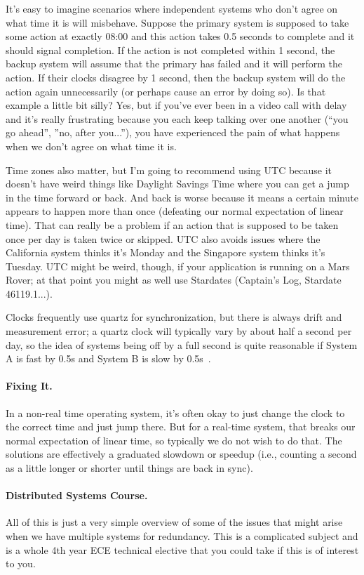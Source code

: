 It's easy to imagine scenarios where independent systems who don't agree on what time it is will misbehave. Suppose the primary system is supposed to take some action at exactly 08:00 and this action takes 0.5 seconds to complete and it should signal completion. If the action is not completed within 1 second, the backup system will assume that the primary has failed and it will perform the action. If their clocks disagree by 1 second, then the backup system will do the action again unnecessarily (or perhaps cause an error by doing so). Is that example a little bit silly? Yes, but if you've ever been in a video call with delay and it's really frustrating because you each keep talking over one another (``you go ahead'', ''no, after you...''), you have experienced the pain of what happens when we don't agree on what time it is.

Time zones also matter, but I'm going to recommend using UTC because it doesn't have weird things like Daylight Savings Time where you can get a jump in the time forward or back. And back is worse because it means a certain minute appears to happen more than once (defeating our normal expectation of linear time). That can really be a problem if an action that is supposed to be taken once per day is taken twice or skipped. UTC also avoids issues where the California system thinks it's Monday and the Singapore system thinks it's Tuesday. UTC might be weird, though, if your application is running on a Mars Rover; at that point you might as well use Stardates (Captain's Log, Stardate 46119.1...).


Clocks frequently use quartz for synchronization, but there is always drift and measurement error; a quartz clock will typically vary by about half a second per day, so the idea of systems being off by a full second is quite reasonable if System A is fast by 0.5s and System B is slow by 0.5s~\cite{mte241}.

\paragraph{Fixing It.}

In a non-real time operating system, it's often okay to just change the clock to the correct time and just jump there. But for a real-time system, that breaks our normal expectation of linear time, so typically we do not wish to do that. The solutions are effectively a graduated slowdown or speedup (i.e., counting a second as a little longer or shorter until things are back in sync).



\paragraph{Distributed Systems Course.}
All of this is just a very simple overview of some of the issues that might arise when we have multiple systems for redundancy. This is a complicated subject and is a whole 4th year ECE technical elective that you could take if this is of interest to you. 



